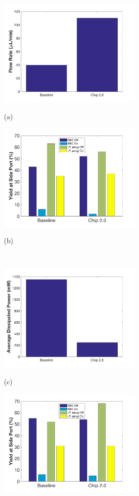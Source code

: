 \begin{figure}[htb]
  \begin{minipage}[t]{0.49\linewidth}\centering
    \includegraphics[width=7cm]{flowBac}
    \medskip
    \centerline{(a)}
  \end{minipage}\hfill
  \begin{minipage}[t]{0.49\linewidth}\centering
    \includegraphics[width=7cm]{maxFlow}
    \medskip
    \centerline{(b)}
  \end{minipage}\\
  \begin{minipage}[t]{0.49\linewidth}\centering
    \includegraphics[width=7cm]{powerBac}
    \medskip
    \centerline{(c)}
  \end{minipage}\hfill
  \begin{minipage}[t]{0.49\linewidth}\centering
    \includegraphics[width=7cm]{minPower}

\end{minipage}
\end{figure}
